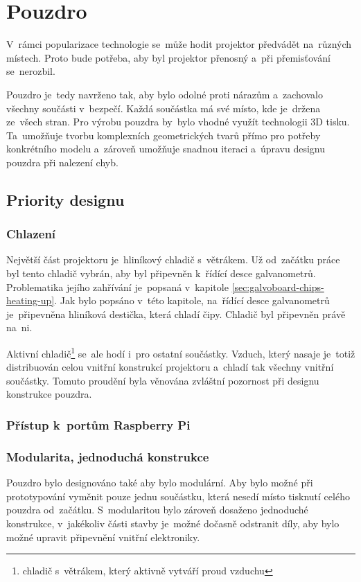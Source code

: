 \section{Pouzdro}

V~rámci popularizace technologie se~může hodit projektor předvádět na~různých místech. Proto bude potřeba, aby byl projektor přenosný a~při přemisťování se~nerozbil.

Pouzdro je~tedy navrženo tak, aby bylo odolné proti nárazům a~zachovalo všechny součásti v~bezpečí. Každá součástka má své místo, kde je~držena ze~všech stran. Pro výrobu pouzdra by~bylo vhodné využít technologii 3D tisku. Ta~umožňuje tvorbu komplexních geometrických tvarů přímo pro potřeby konkrétního modelu a~zároveň umožňuje snadnou iteraci a~úpravu designu pouzdra při nalezení chyb.

\subsection{Priority designu} \label{sec:krabick-design-priorities}
\subsubsection{Chlazení}
Největší část projektoru je~hliníkový chladič s~větrákem. Už od~začátku práce byl tento chladič vybrán, aby byl připevněn k~řídící desce galvanometrů. Problematika jejího zahřívání je~popsaná v~kapitole \ref{sec:galvoboard-chips-heating-up}.
Jak bylo popsáno v~této kapitole, na~řídící desce galvanometrů je~připevněna hliníková destička, která chladí čipy. Chladič byl připevněn právě na~ni.

Aktivní chladič\footnote{chladič s~větrákem, který aktivně vytváří proud vzduchu} se~ale hodí i~pro ostatní součástky. Vzduch, který nasaje je~totiž distribuován celou vnitřní konstrukcí projektoru a~chladí tak všechny vnitřní součástky. Tomuto proudění byla věnována zvláštní pozornost při designu konstrukce pouzdra.

\subsubsection{Přístup k~portům Raspberry Pi}


\subsubsection{Modularita, jednoduchá konstrukce}
Pouzdro bylo designováno také aby bylo modulární. Aby bylo možné při prototypování vyměnit pouze jednu součástku, která nesedí místo tisknutí celého pouzdra od~začátku. S~modularitou bylo zároveň dosaženo jednoduché konstrukce, v~jakékoliv části stavby je~možné dočasně odstranit díly, aby bylo možné upravit připevnění vnitřní elektroniky.

